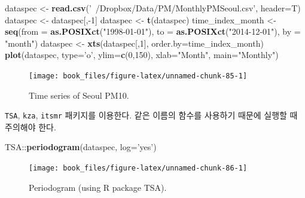 \documentclass[b5paper,]{scrbook}
\makeatletter
\newenvironment{Shaded}{\begin{snugshade}}{\end{snugshade}}
\newcommand{\KeywordTok}[1]{\textcolor[rgb]{0.13,0.29,0.53}{\textbf{{#1}}}}
\newcommand{\DataTypeTok}[1]{\textcolor[rgb]{0.13,0.29,0.53}{{#1}}}
\newcommand{\DecValTok}[1]{\textcolor[rgb]{0.00,0.00,0.81}{{#1}}}
\newcommand{\StringTok}[1]{\textcolor[rgb]{0.31,0.60,0.02}{{#1}}}
\newcommand{\NormalTok}[1]{{#1}}
\theoremstyle{plain}
\theoremstyle{definition}
\numberwithin{equation}{section}
\newenvironment{kframe}{%
\medskip{}
\setlength{\fboxsep}{.8em}
 \def\at@end@of@kframe{}%
 \ifinner\ifhmode%
  \def\at@end@of@kframe{\end{minipage}}%
  \begin{minipage}{\columnwidth}%
 \fi\fi%
 \def\FrameCommand##1{\hskip\@totalleftmargin \hskip-\fboxsep
 \colorbox{shadecolor}{##1}\hskip-\fboxsep
     \hskip-\linewidth \hskip-\@totalleftmargin \hskip\columnwidth}%
 \MakeFramed {\advance\hsize-\width
   \@totalleftmargin\z@ \linewidth\hsize
   \@setminipage}}%
 {\par\unskip\endMakeFramed%
 \at@end@of@kframe}
\renewenvironment{Shaded}{\begin{kframe}}{\end{kframe}}
\makeatother
\begin{document}
\begin{Shaded}
\begin{Highlighting}[]
\NormalTok{dataspec <-}\StringTok{ }\KeywordTok{read.csv}\NormalTok{(}\StringTok{'~/Dropbox/Data/PM/MonthlyPMSeoul.csv'}\NormalTok{, }\DataTypeTok{header=}\NormalTok{T)}
\NormalTok{dataspec <-}\StringTok{ }\NormalTok{dataspec[,-}\DecValTok{1}\NormalTok{]}
\NormalTok{dataspec <-}\StringTok{ }\KeywordTok{t}\NormalTok{(dataspec)}
\NormalTok{time_index_month <-}\StringTok{ }\KeywordTok{seq}\NormalTok{(}\DataTypeTok{from =} \KeywordTok{as.POSIXct}\NormalTok{(}\StringTok{"1998-01-01"}\NormalTok{), }\DataTypeTok{to =} \KeywordTok{as.POSIXct}\NormalTok{(}\StringTok{"2014-12-01"}\NormalTok{), }\DataTypeTok{by =} \StringTok{"month"}\NormalTok{)}
\NormalTok{dataspec <-}\StringTok{ }\KeywordTok{xts}\NormalTok{(dataspec[,}\DecValTok{1}\NormalTok{], }\DataTypeTok{order.by=}\NormalTok{time_index_month)}
\KeywordTok{plot}\NormalTok{(dataspec, }\DataTypeTok{type=}\StringTok{'o'}\NormalTok{, }\DataTypeTok{ylim=}\KeywordTok{c}\NormalTok{(}\DecValTok{0}\NormalTok{,}\DecValTok{150}\NormalTok{), }\DataTypeTok{xlab=}\StringTok{"Month"}\NormalTok{, }\DataTypeTok{main=}\StringTok{"Monthly"}\NormalTok{)}
\end{Highlighting}
\end{Shaded}

\begin{figure}

{\centering \texttt{[image: book\_files/figure-latex/unnamed-chunk-85-1]} 

}

\caption{Time series of Seoul PM10.}\label{fig:unnamed-chunk-85}
\end{figure}

\texttt{TSA}, \texttt{kza}, \texttt{itsmr} 패키지를 이용한다. 같은
이름의 함수를 사용하기 때문에 실행할 때 주의해야 한다.

\begin{Shaded}
\begin{Highlighting}[]
\NormalTok{TSA::}\KeywordTok{periodogram}\NormalTok{(dataspec, }\DataTypeTok{log=}\StringTok{'yes'}\NormalTok{)}
\end{Highlighting}
\end{Shaded}

\begin{figure}

{\centering \texttt{[image: book\_files/figure-latex/unnamed-chunk-86-1]} 

}

\caption{Periodogram (using R package TSA).}\label{fig:unnamed-chunk-86}
\end{figure}
\end{document}
